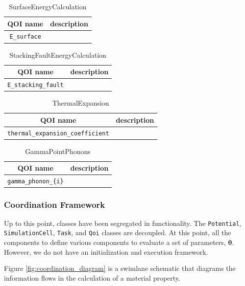 \begin{table}[ht]
	\centering
	\caption{SurfaceEnergyCalculation}
	\begin{tabular}{cc}
		\hline
		QOI name & description \\
		\hline
		\verb|E_surface| \\
		\hline
	\end{tabular}
\end{table}

\begin{table}[ht]
	\centering
	\caption{StackingFaultEnergyCalculation}
	\begin{tabular}{cc}
		\hline
		QOI name & description \\
		\hline
		\verb|E_stacking_fault| \\
		\hline
	\end{tabular}
\end{table}

\begin{table}[ht]
	\centering
	\caption{ThermalExpansion}
	\begin{tabular}{cc}
		\hline
		QOI name & description \\
		\hline
		\verb|thermal_expansion_coefficient| \\
		\hline
	\end{tabular}
\end{table}

\begin{table}[ht]
	\centering
	\caption{GammaPointPhonons}
	\begin{tabular}{cc}
		\hline
		QOI name & description \\
		\hline
		\verb|gamma_phonon_{i}| \\
		\hline
	\end{tabular}
\end{table}

\subsubsection{Coordination Framework}

Up to this point, classes have been segregated in functionality.  The \verb|Potential|, \verb|SimulationCell|, \verb|Task|, and \verb|Qoi| classes are decoupled.  At this point, all the components to define various components to evaluate a set of parameters, $\bm{\theta}$.  However, we do not have an initialization and execution framework.

Figure \ref{fig:coordination_diagram} is a swimlane schematic that diagrams the information flows in the calculation of a material property.

